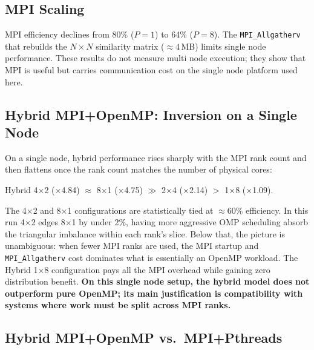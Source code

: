\documentclass[11pt,a4paper]{article}
\newcommand{\code}[1]{\texttt{\small #1}}
\begin{document}
\subsection{MPI Scaling}

MPI efficiency declines from 80\% ($P=1$) to 64\% ($P=8$). The
\code{MPI\_Allgatherv} that rebuilds the $N \times N$ similarity matrix
($\approx 4$\,MB) limits single node performance. These results do not measure
multi node execution; they show that MPI is useful but carries communication
cost on the single node platform used here.

\subsection{Hybrid MPI+OpenMP: Inversion on a Single Node}

On a single node, hybrid performance rises sharply with the MPI rank count and
then flattens once the rank count matches the number of physical cores:
\begin{center}
Hybrid 4$\times$2 ($\times$4.84) $\approx$ 8$\times$1 ($\times$4.75)
$\gg$ 2$\times$4 ($\times$2.14) $>$ 1$\times$8 ($\times$1.09).
\end{center}
The 4$\times$2 and 8$\times$1 configurations are statistically tied at
$\approx$60\% efficiency. In this run 4$\times$2 edges 8$\times$1 by under
2\%, having more aggressive OMP scheduling absorb the triangular imbalance
within each rank's slice. Below that, the picture is unambiguous: when fewer
MPI ranks are used, the MPI startup and \code{MPI\_Allgatherv} cost dominates
what is essentially an OpenMP workload. The Hybrid 1$\times$8 configuration
pays all the MPI overhead while gaining zero distribution benefit.
\textbf{On this single node setup, the hybrid model does not outperform pure
OpenMP; its main justification is compatibility with systems where work must be
split across MPI ranks.}

\subsection{Hybrid MPI+OpenMP vs.\ MPI+Pthreads}
\end{document}
